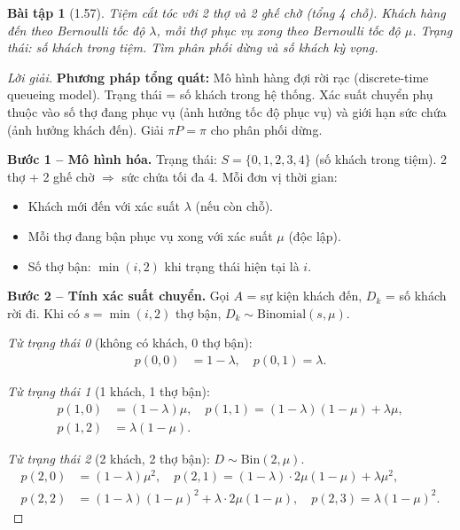 \documentclass[8pt,a4paper]{article}
\newtheorem{exercise}{Bài tập}
\newenvironment{solution}{\begin{proof}[Lời giải]}{\end{proof}}
\begin{document}
\begin{exercise}[1.57]
Tiệm cắt tóc với 2 thợ và 2 ghế chờ (tổng 4 chỗ). Khách hàng đến theo Bernoulli tốc độ $\lambda$, mỗi thợ phục vụ xong theo Bernoulli tốc độ $\mu$. Trạng thái: số khách trong tiệm. Tìm phân phối dừng và số khách kỳ vọng.
\end{exercise}
\begin{solution}
\textbf{Phương pháp tổng quát:} Mô hình hàng đợi rời rạc (discrete-time queueing model). Trạng thái = số khách trong hệ thống. Xác suất chuyển phụ thuộc vào số thợ đang phục vụ (ảnh hưởng tốc độ phục vụ) và giới hạn sức chứa (ảnh hưởng khách đến). Giải $\pi P = \pi$ cho phân phối dừng.

\textbf{Bước 1 -- Mô hình hóa.}
Trạng thái: $S = \{0, 1, 2, 3, 4\}$ (số khách trong tiệm). 2 thợ + 2 ghế chờ $\Rightarrow$ sức chứa tối đa 4. Mỗi đơn vị thời gian:
\begin{itemize}[nosep]
  \item Khách mới đến với xác suất $\lambda$ (nếu còn chỗ).
  \item Mỗi thợ đang bận phục vụ xong với xác suất $\mu$ (độc lập).
  \item Số thợ bận: $\min(i, 2)$ khi trạng thái hiện tại là $i$.
\end{itemize}

\textbf{Bước 2 -- Tính xác suất chuyển.}
Gọi $A$ = sự kiện khách đến, $D_k$ = số khách rời đi. Khi có $s = \min(i, 2)$ thợ bận, $D_k \sim \text{Binomial}(s, \mu)$.

\textit{Từ trạng thái 0} (không có khách, 0 thợ bận):
\begin{align*}
  p(0, 0) &= 1 - \lambda, \quad p(0, 1) = \lambda.
\end{align*}

\textit{Từ trạng thái 1} (1 khách, 1 thợ bận):
\begin{align*}
  p(1, 0) &= (1-\lambda)\mu, \quad p(1, 1) = (1-\lambda)(1-\mu) + \lambda\mu, \\
  p(1, 2) &= \lambda(1-\mu).
\end{align*}

\textit{Từ trạng thái 2} (2 khách, 2 thợ bận): $D \sim \text{Bin}(2, \mu)$.
\begin{align*}
  p(2, 0) &= (1-\lambda)\mu^2, \quad
  p(2, 1) = (1-\lambda) \cdot 2\mu(1-\mu) + \lambda \mu^2, \\
  p(2, 2) &= (1-\lambda)(1-\mu)^2 + \lambda \cdot 2\mu(1-\mu), \quad
  p(2, 3) = \lambda(1-\mu)^2.
\end{align*}


\end{solution}
\end{document}
